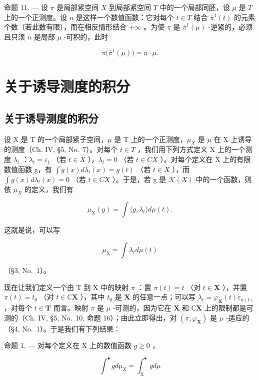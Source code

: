 命题 11. --- 设 \(\pi\) 是局部紧空间 \(X\) 到局部紧空间 \(T\) 中的一个局部同胚，设 \(\mu\) 是 \(T\) 上的一个正测度。设 \(n\) 是这样一个数值函数：它对每个 \(t \in T\) 结合 \(\overline{\pi}^{1}(t)\) 的元素个数（若此数有限），而在相反情形结合 \(+\infty\) 。为使 \(\pi\) 是 \(\overline{\pi}^{1}(\mu)\) -逆紧的，必须且只须 \(n\) 是局部 \(\mu\) -可积的，此时

\[
\pi \big (\bar {\pi} ^ {1} (\mu) \big) = n \cdot \mu .\tag{15}
\]

\section{关于诱导测度的积分}

\subsection{关于诱导测度的积分}

设 X 是 T 的一个局部紧子空间，\(\mu\) 是 T 上的一个正测度，\(\mu_{X}\) 是 \(\mu\) 在 X 上诱导的测度（Ch. IV, §5, No.~7）。对每个 \(t \in T\) ，我们用下列方式定义 X 上的一个测度 \(\lambda_{t}\) ：\(\lambda_{t} = \varepsilon_{t}\) （若 \(t \in X\) ），\(\lambda_{t} = 0\) （若 \(t \in C X\) ）。对每个定义在 X 上的有限数值函数 g，有 \(\int g(x) d\lambda_{t}(x) = g(t)\) （若 \(t \in X\) ），而 \(\int g(x) d\lambda_{t}(x) = 0\) （若 \(t \in C X\) ）。于是，若 g 是 \(\mathcal{K}(X)\) 中的一个函数，则依 \(\mu_{X}\) 的定义，我们有

\[
\mu_ {\mathrm{X}} (g) = \int \langle g, \lambda_ {t} \rangle d \mu (t).\tag{1}
\]

这就是说，可以写

\[
\mu_ {\mathrm{X}} = \int \lambda_ {t} d \mu (t)\tag{2}
\]

（§3, No.~1）。

现在让我们定义一个由 T 到 X 中的映射 \(\pi\) ：置 \(\pi(t) = t\) （对 \(t \in \mathbf{X}\) ），并置 \(\pi(t) = t_0\) （对 \(t \in \mathbb{C} \mathbf{X}\) ），其中 \(t_0\) 是 \(\mathbf{X}\) 的任意一点；可以写 \(\lambda_t = \varphi_{\mathbf{X}}(t) \varepsilon_{\pi(t)}\) ，对每个 \(t \in \mathbf{T}\) 而言。映射 \(\pi\) 是 \(\mu\) -可测的，因为它在 \(\mathbf{X}\) 和 \(\mathbb{C} \mathbf{X}\) 上的限制都是可测的（Ch. IV, §5, No.~10, 命题 16）；由此立即得出，对 \((\pi, \varphi_{\mathbf{X}})\) 是 \(\mu\) -适应的（§4, No.~1）。于是我们有下列结果：

命题 1. --- 对每个定义在 X 上的数值函数 \(g \geqslant 0\) ，

\[
\int^ {\bullet} g d \mu_ {\mathrm{X}} = \int_ {\mathrm{X}} ^ {\bullet} g d \mu\tag{3}
\]

